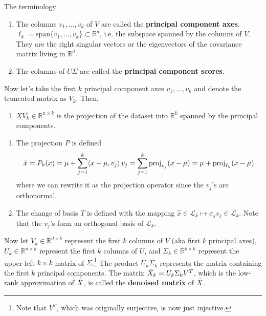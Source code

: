   \begin{definition}[Terminology]
    The terminology 
    \begin{enumerate}
      \item The columns $v_1, \ldots, v_d$ of $V$ are called the \textbf{principal component axes}. $\ell_k = \mathrm{span}\{v_1, \ldots, v_k\} \subset \mathbb{R}^d$, i.e. the subspace spanned by the columns of $V$. They are the right singular vectors or the eigenvectors of the covariance matrix living in $\mathbb{R}^d$. 
      \item The columns of $U \Sigma$ are called the \textbf{principal component scores}. 
    \end{enumerate}

    Now let's take the first $k$ principal component axes $v_1, \ldots, v_k$ and denote the truncated matrix as $V_k$. Then, 
    \begin{enumerate}
      \item $X V_k \in \mathbb{R}^{n \times k}$ is the projection of the dataset into $\mathbb{R}^k$ spanned by the principal components. 
    \end{enumerate}


    \begin{enumerate}
      \item The projection $P$ is defined 
      \begin{equation}
        \hat{x} = P_k (x) = \mu + \sum_{j=1}^k \langle x - \mu, v_j \rangle \, v_j = \sum_{j=1}^k \operatorname{proj}_{v_j} (x - \mu) = \mu + \operatorname{proj}_{\ell_k} (x - \mu)
      \end{equation}
      where we can rewrite it as the projection operator since the $v_j$'s are orthonormal. 

      \item The change of basis $T$ is defined with the mapping $\hat{x} \in \mathcal{L}_k \mapsto \sigma_j v_j \in \mathcal{L}_k$. Note that the $v_j$'s form an orthogonal basis of $\mathcal{L}_k$. 
    \end{enumerate} 
    Now let $V_k \in \mathbb{R}^{d \times k}$ represent the first $k$ columns of $V$ (aka first $k$ principal axes), $U_k \in \mathbb{R}^{n \times k}$ represent the first $k$ columns of $U$, and $\Sigma_k \in \mathbb{R}^{k \times k}$ represent the upper-left $k \times k$ matrix of $\Sigma$.\footnote{Note that $V^T$, which was originally surjective, is now just injective.} The product $U_k \Sigma_k$ represents the matrix containing the first $k$ principal components. The matrix $\Tilde{X}_k = U_k \Sigma_k V^T$, which is the low-rank approximation of $\Tilde{X}$, is called the \textbf{denoised matrix} of $\Tilde{X}$. 
  \end{definition}
